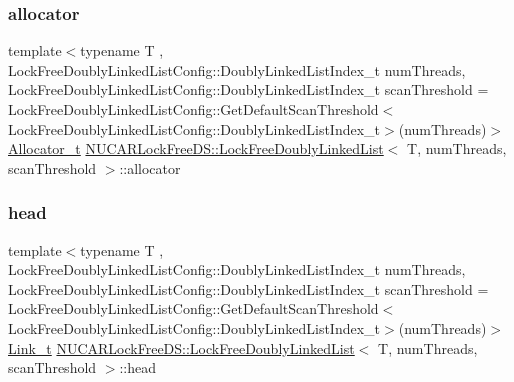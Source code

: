 \subsubsection{\texorpdfstring{allocator}{allocator}}
{\footnotesize\ttfamily template$<$typename T , Lock\+Free\+Doubly\+Linked\+List\+Config\+::\+Doubly\+Linked\+List\+Index\+\_\+t num\+Threads, Lock\+Free\+Doubly\+Linked\+List\+Config\+::\+Doubly\+Linked\+List\+Index\+\_\+t scan\+Threshold = Lock\+Free\+Doubly\+Linked\+List\+Config\+::\+Get\+Default\+Scan\+Threshold$<$\+Lock\+Free\+Doubly\+Linked\+List\+Config\+::\+Doubly\+Linked\+List\+Index\+\_\+t$>$(num\+Threads)$>$ \\
\mbox{\hyperlink{class_n_u_c_a_r_lock_free_d_s_1_1_lock_free_doubly_linked_list_af534991f4eb0641191f936a80c701e6c}{Allocator\+\_\+t}} \mbox{\hyperlink{class_n_u_c_a_r_lock_free_d_s_1_1_lock_free_doubly_linked_list}{N\+U\+C\+A\+R\+Lock\+Free\+D\+S\+::\+Lock\+Free\+Doubly\+Linked\+List}}$<$ T, num\+Threads, scan\+Threshold $>$\+::allocator\hspace{0.3cm}{\ttfamily [private]}}

\mbox{\label{class_n_u_c_a_r_lock_free_d_s_1_1_lock_free_doubly_linked_list_a88b740e087ee76139d5291fcd70cf879}} 
\subsubsection{\texorpdfstring{head}{head}}
{\footnotesize\ttfamily template$<$typename T , Lock\+Free\+Doubly\+Linked\+List\+Config\+::\+Doubly\+Linked\+List\+Index\+\_\+t num\+Threads, Lock\+Free\+Doubly\+Linked\+List\+Config\+::\+Doubly\+Linked\+List\+Index\+\_\+t scan\+Threshold = Lock\+Free\+Doubly\+Linked\+List\+Config\+::\+Get\+Default\+Scan\+Threshold$<$\+Lock\+Free\+Doubly\+Linked\+List\+Config\+::\+Doubly\+Linked\+List\+Index\+\_\+t$>$(num\+Threads)$>$ \\
\mbox{\hyperlink{class_n_u_c_a_r_lock_free_d_s_1_1_lock_free_doubly_linked_list_a08f21d5e04bc2a02d6c1d8861a6ba0de}{Link\+\_\+t}} \mbox{\hyperlink{class_n_u_c_a_r_lock_free_d_s_1_1_lock_free_doubly_linked_list}{N\+U\+C\+A\+R\+Lock\+Free\+D\+S\+::\+Lock\+Free\+Doubly\+Linked\+List}}$<$ T, num\+Threads, scan\+Threshold $>$\+::head\hspace{0.3cm}{\ttfamily [private]}}

